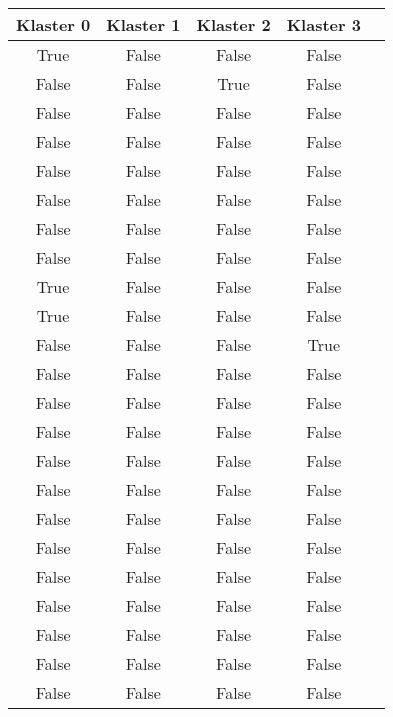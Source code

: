 \documentclass[../EDI_Task3_Karwowski_Kowalewski.tex]{subfiles}
\begin{document}
{{    %
        \begin{table}[!htbp]
            \scriptsize
            \centering
            \begin{tabular}{|c|c|c|c|c|}
                \hline
                Klaster 0 & Klaster 1 & Klaster 2 & Klaster 3 \\ \hline
                  True   &   False   &   False   &   False \\
                 False   &   False   &    True   &   False \\
                 False   &   False   &   False   &   False \\
                 False   &   False   &   False   &   False \\
                 False   &   False   &   False   &   False \\
                 False   &   False   &   False   &   False \\
                 False   &   False   &   False   &   False \\
                 False   &   False   &   False   &   False \\
                  True   &   False   &   False   &   False \\
                  True   &   False   &   False   &   False \\
                 False   &   False   &   False   &    True \\
                 False   &   False   &   False   &   False \\
                 False   &   False   &   False   &   False \\
                 False   &   False   &   False   &   False \\
                 False   &   False   &   False   &   False \\
                 False   &   False   &   False   &   False \\
                 False   &   False   &   False   &   False \\
                 False   &   False   &   False   &   False \\
                 False   &   False   &   False   &   False \\
                 False   &   False   &   False   &   False \\
                 False   &   False   &   False   &   False \\
                 False   &   False   &   False   &   False \\
                 False   &   False   &   False   &   False \\

\end{tabular}
\end{table}}}
\end{document}
